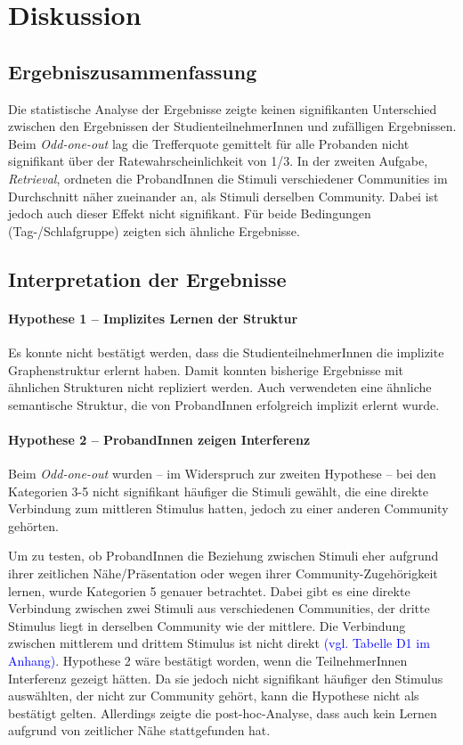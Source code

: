 \section{Diskussion}
\label{S:4}
\subsection{Ergebniszusammenfassung}
Die statistische Analyse der Ergebnisse zeigte keinen signifikanten Unterschied zwischen den Ergebnissen der StudienteilnehmerInnen und zufälligen Ergebnissen. Beim \textit{Odd-one-out} lag die Trefferquote gemittelt für alle Probanden nicht signifikant über der Ratewahrscheinlichkeit von 1/3. In der zweiten Aufgabe, \textit{Retrieval}, ordneten die ProbandInnen die Stimuli verschiedener Communities im Durchschnitt näher zueinander an, als Stimuli derselben Community. Dabei ist jedoch auch dieser Effekt nicht signifikant. Für beide Bedingungen (Tag-/Schlafgruppe) zeigten sich ähnliche Ergebnisse.

\subsection{Interpretation der Ergebnisse}
\paragraph{Hypothese 1 – Implizites Lernen der Struktur}
Es konnte nicht bestätigt werden, dass die StudienteilnehmerInnen die implizite Graphenstruktur erlernt haben. Damit konnten bisherige Ergebnisse mit ähnlichen Strukturen \citep[see][]{Schapiro2013} nicht repliziert werden. Auch \citet{Garvert2017} verwendeten eine ähnliche semantische Struktur, die von ProbandInnen erfolgreich implizit erlernt wurde.

\paragraph{Hypothese 2 – ProbandInnen zeigen Interferenz}
Beim \textit{Odd-one-out} wurden – im Widerspruch zur zweiten Hypothese – bei den Kategorien 3-5 nicht signifikant häufiger die Stimuli gewählt, die eine direkte Verbindung zum mittleren Stimulus hatten, jedoch zu einer anderen Community gehörten.

Um zu testen, ob ProbandInnen die Beziehung zwischen Stimuli eher aufgrund ihrer zeitlichen Nähe/Präsentation oder wegen ihrer Community-Zugehörigkeit lernen, wurde Kategorien 5 genauer betrachtet. Dabei gibt es eine direkte Verbindung zwischen zwei Stimuli aus verschiedenen Communities, der dritte Stimulus liegt in derselben Community wie der mittlere. Die Verbindung zwischen mittlerem und drittem Stimulus ist nicht direkt \textcolor{blue}{(vgl. Tabelle D1 im Anhang)}. Hypothese 2 wäre bestätigt worden, wenn die TeilnehmerInnen Interferenz gezeigt hätten. Da sie jedoch nicht signifikant häufiger den Stimulus auswählten, der nicht zur Community gehört, kann die Hypothese nicht als bestätigt gelten. Allerdings zeigte die post-hoc-Analyse, dass auch kein Lernen aufgrund von zeitlicher Nähe stattgefunden hat.

